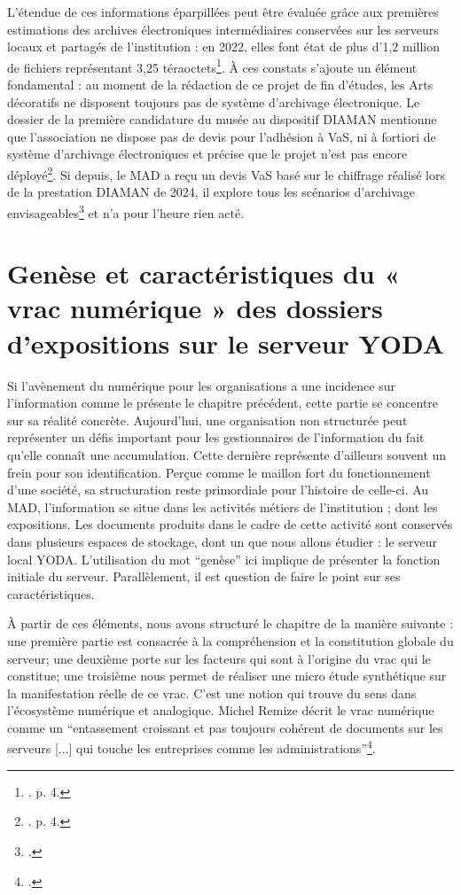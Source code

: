 L’étendue de ces informations éparpillées peut être évaluée grâce aux premières estimations des archives électroniques intermédiaires conservées sur les serveurs locaux et partagés de l’institution : en 2022, elles font état de plus d’1,2 million de fichiers représentant 3,25 téraoctets\footnote{\cite{bomel-dion-mad-y-vas-2022}. p. 4.}. À ces constats s’ajoute un élément fondamental : au moment de la rédaction de ce projet de fin d’études, les Arts décoratifs ne disposent toujours pas de système d’archivage électronique. Le dossier de la première candidature du musée au dispositif DIAMAN mentionne que l’association ne dispose pas de devis pour l’adhésion à VaS, ni à fortiori de système d’archivage électroniques et précise que le projet n’est pas encore déployé\footnote{\cite{bomel-dion-mad-y-vas-2022}. p. 4.}. Si depuis, le MAD a reçu un devis VaS basé sur le chiffrage réalisé lors de la prestation DIAMAN de 2024, il explore tous les scénarios d’archivage envisageables\footnote{\cite{dion-choix-archivage-2026}.} et n’a pour l’heure rien acté. 

 
\chapter{Genèse et caractéristiques  du « vrac numérique » des dossiers d’expositions sur le serveur YODA}

Si l’avènement du numérique pour les organisations a une incidence sur l’information comme le présente le chapitre précédent, cette partie se concentre sur sa réalité concrète. Aujourd’hui, une organisation non structurée peut représenter un défis important pour les gestionnaires de l’information du fait qu'elle connaît une accumulation. Cette dernière représente d'ailleurs souvent un frein pour son identification. Perçue comme le maillon fort du fonctionnement d’une société, sa structuration reste primordiale pour l’histoire de celle-ci. Au MAD, l’information se situe dans les activités métiers de l’institution ; dont les expositions. Les documents produits dans le cadre de cette activité sont conservés dans plusieurs espaces de stockage, dont un que nous allons étudier : le serveur local YODA. L’utilisation du mot \enquote{genèse} ici implique de présenter la fonction initiale du serveur. Parallèlement, il est question de faire le point sur ses caractéristiques.

À partir de ces éléments, nous avons structuré le chapitre de la manière suivante : une première partie est consacrée à la compréhension et la constitution globale du serveur; une deuxième porte sur les facteurs qui sont à l’origine du vrac qui le constitue; une troisième nous permet de réaliser une micro étude synthétique sur la manifestation réelle de ce vrac. C'est une notion qui trouve du sens dans l'écosystème numérique et analogique. Michel Remize décrit le vrac numérique comme un \enquote{entassement croissant et pas toujours cohérent de documents sur les serveurs [...] qui touche les entreprises comme les administrations}\footnote{\cite{remize-2021}.}. 

